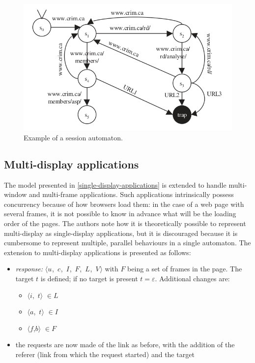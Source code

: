 \documentclass[a4paper,10pt]{article}
\newcommand{\tuple}[1]{\mbox{$\langle$#1$\rangle$}}
\newcommand{\resmulti}[1][]{
  \ifthenelse{\equal{#1}{}}{\mbox{$\langle u$, $c$, $I$, $F$, $L$, $V\rangle$}}
  {\mbox{$\langle u_{#1}$, $c_{#1}$, $I_{#1}$, $F_{#1}$, $L_{#1}$, $V_{#1}\rangle$}}
}
\theoremstyle{plain} %
\theoremstyle{definition}
\theoremstyle{remark}
\begin{document}
\begin{figure}[h]
  \includegraphics[width=\textwidth]{img/session_automaton_example.png}
  \caption{Example of a session automaton.}
  \label{fig:example-session-automaton}
\end{figure}

\subsection{Multi-display applications}

The model presented in \cref{single-display-applications} is extended to handle multi-window and multi-frame applications. Such applications intrinsically possess concurrency because of how browsers load them: in the case of a web page with several frames, it is not possible to know in advance what will be the loading order of the pages. The authors note how it is theoretically possible to represent multi-display as single-display applications, but it is discouraged because it is cumbersome to represent multiple, parallel behaviours in a single automaton. The extension to multi-display applications is presented as follows:

\begin{itemize}
  \item \textit{response:} \resmulti with $F$ being a set of frames in the page. The target $t$ is defined; if no target is present $t = \varepsilon$. Additional changes are:
    \begin{itemize}
      \item \tuple{$i$, $t$} $\in L$
      \item \tuple{$a$, $t$} $\in I$
      \item \tuple{$f$,$b$} $\in F$
    \end{itemize}
  \item the requests are now made of the link as before, with the addition of the referer (link from which the request started) and the target
\end{itemize}
\end{document}
